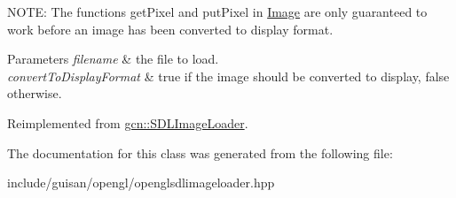 N\+O\+TE\+: The functions get\+Pixel and put\+Pixel in \hyperlink{classgcn_1_1Image}{Image} are only guaranteed to work before an image has been converted to display format.


\begin{DoxyParams}{Parameters}
{\em filename} & the file to load. \\
\hline
{\em convert\+To\+Display\+Format} & true if the image should be converted to display, false otherwise. \\
\hline
\end{DoxyParams}


Reimplemented from \hyperlink{classgcn_1_1SDLImageLoader_ab22c9ab6175e52d0c76a11cae64bdd1f}{gcn\+::\+S\+D\+L\+Image\+Loader}.



The documentation for this class was generated from the following file\+:\begin{DoxyCompactItemize}
\item 
include/guisan/opengl/openglsdlimageloader.\+hpp\end{DoxyCompactItemize}

